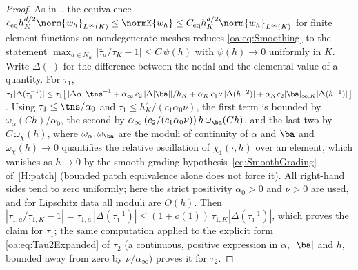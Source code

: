 \begin{proof}
As in~\cite[Lemma~2]{codina2008analysis}, the equivalence
$c_{\mathrm{eq}} h_K^{d/2}\norm{w_h}_{L^\infty(K)} \le \normK{w_h} \le
C_{\mathrm{eq}} h_K^{d/2}\norm{w_h}_{L^\infty(K)}$ for finite element functions on nondegenerate
meshes reduces \cref{oa:eq:Smoothing} to the statement
$\max_{a\in N_K} |\bar\tau_a/\tau_K - 1| \le C\,\psi(h)$ with $\psi(h)\to 0$
uniformly in $K$. Write $\Delta(\cdot)$ for the difference between the nodal and the
elemental value of a quantity. For $\tau_1$,
$\tau_{1}|\Delta(\tau_1^{-1})| \le
\tau_1\bigl[\,|\Delta\alpha|\,\tns^{-1}
+ \alpha_\infty\, c_2\,|\Delta|\ba||/h_K
+ \alpha_K\, c_1\nu\,|\Delta(h^{-2})| + \alpha_K c_2 |\ba|_{\infty,K}|\Delta(h^{-1})|\,\bigr]$.
Using $\tau_1 \le \tns/\alpha_0$ and $\tau_1 \le h_K^2/(c_1\alpha_0\nu)$,
the first term is bounded by $\omega_\alpha(Ch)/\alpha_0$, the second by
$\alpha_\infty\,(c_2/(c_1\alpha_0\nu))\,h\,\omega_{\ba}(Ch)$, and the last two by
$C\,\omega_{\chi}(h)$, where $\omega_\alpha, \omega_{\ba}$ are the moduli of
continuity of $\alpha$ and $\ba$ and $\omega_\chi(h)\to 0$ quantifies the relative
oscillation of $\chi_1(\cdot,h)$ over an element, which vanishes as $h \to 0$ by the
smooth{\hyp}grading hypothesis~\cref{eq:SmoothGrading} of~\cref{H:patch} (bounded patch
equivalence alone does not force it). All right-hand sides tend to zero
uniformly; here the strict positivity $\alpha_0 > 0$ and $\nu > 0$ are used, and for
Lipschitz data all moduli are $O(h)$. Then
$|\bar\tau_{1,a}/\tau_{1,K} - 1| = \bar\tau_{1,a}\,|\Delta(\tau_1^{-1})|
\le (1+o(1))\,\tau_{1,K}|\Delta(\tau_1^{-1})|$, which proves the claim for $\tau_1$;
the same computation applied to the explicit form \cref{oa:eq:Tau2Expanded} of $\tau_2$
(a continuous, positive expression in $\alpha$, $|\ba|$ and $h$, bounded away from
zero by $\nu/\alpha_\infty$) proves it for $\tau_2$.
\end{proof}


